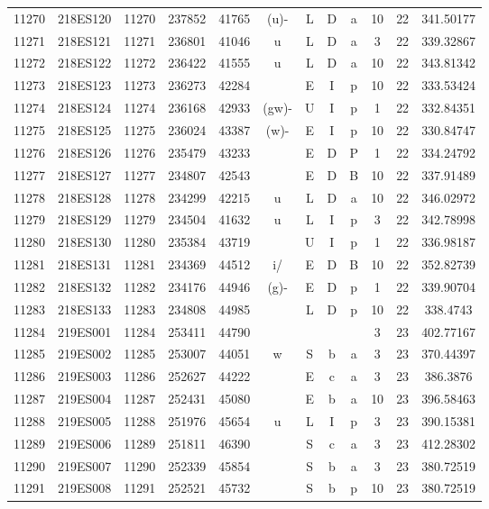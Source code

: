 \begin{tabular}{|*{12}{c|}}
11270 & 218ES120 & 11270 & 237852 & 41765 & (u)- & L & D & a & 10 & 22 & 341.50177 \\ 
11271 & 218ES121 & 11271 & 236801 & 41046 & u & L & D & a & 3 & 22 & 339.32867 \\ 
11272 & 218ES122 & 11272 & 236422 & 41555 & u & L & D & a & 10 & 22 & 343.81342 \\ 
11273 & 218ES123 & 11273 & 236273 & 42284 &  & E & I & p & 10 & 22 & 333.53424 \\ 
11274 & 218ES124 & 11274 & 236168 & 42933 & (gw)- & U & I & p & 1 & 22 & 332.84351 \\ 
11275 & 218ES125 & 11275 & 236024 & 43387 & (w)- & E & I & p & 10 & 22 & 330.84747 \\ 
11276 & 218ES126 & 11276 & 235479 & 43233 &  & E & D & P & 1 & 22 & 334.24792 \\ 
11277 & 218ES127 & 11277 & 234807 & 42543 &  & E & D & B & 10 & 22 & 337.91489 \\ 
11278 & 218ES128 & 11278 & 234299 & 42215 & u & L & D & a & 10 & 22 & 346.02972 \\ 
11279 & 218ES129 & 11279 & 234504 & 41632 & u & L & I & p & 3 & 22 & 342.78998 \\ 
11280 & 218ES130 & 11280 & 235384 & 43719 &  & U & I & p & 1 & 22 & 336.98187 \\ 
11281 & 218ES131 & 11281 & 234369 & 44512 & i/ & E & D & B & 10 & 22 & 352.82739 \\ 
11282 & 218ES132 & 11282 & 234176 & 44946 & (g)- & E & D & p & 1 & 22 & 339.90704 \\ 
11283 & 218ES133 & 11283 & 234808 & 44985 &  & L & D & p & 10 & 22 & 338.4743 \\ 
11284 & 219ES001 & 11284 & 253411 & 44790 &  &  &  &  & 3 & 23 & 402.77167 \\ 
11285 & 219ES002 & 11285 & 253007 & 44051 & w & S & b & a & 3 & 23 & 370.44397 \\ 
11286 & 219ES003 & 11286 & 252627 & 44222 &  & E & c & a & 3 & 23 & 386.3876 \\ 
11287 & 219ES004 & 11287 & 252431 & 45080 &  & E & b & a & 10 & 23 & 396.58463 \\ 
11288 & 219ES005 & 11288 & 251976 & 45654 & u & L & I & p & 3 & 23 & 390.15381 \\ 
11289 & 219ES006 & 11289 & 251811 & 46390 &  & S & c & a & 3 & 23 & 412.28302 \\ 
11290 & 219ES007 & 11290 & 252339 & 45854 &  & S & b & a & 3 & 23 & 380.72519 \\ 
11291 & 219ES008 & 11291 & 252521 & 45732 &  & S & b & p & 10 & 23 & 380.72519 \\ 

\end{tabular}

